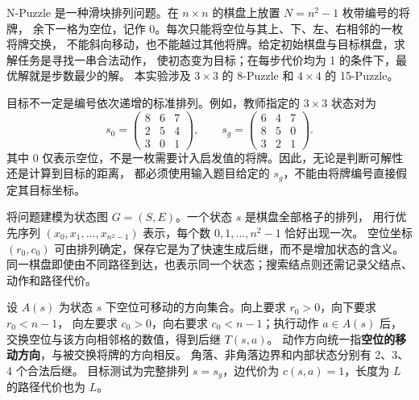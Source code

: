 \hypersetup{colorlinks=true, linkcolor=TemplateBlue, citecolor=TemplateBlue, urlcolor=TemplateBlue}


\par\vspace{6bp}
\begingroup
\setlength{\parskip}{3bp}

\par\vspace{2bp}

N-Puzzle 是一种滑块排列问题。在 $n\times n$ 的棋盘上放置 $N=n^2-1$ 枚带编号的将牌，
余下一格为空位，记作 0。每次只能将空位与其上、下、左、右相邻的一枚将牌交换，
不能斜向移动，也不能越过其他将牌。给定初始棋盘与目标棋盘，求解任务是寻找一串合法动作，
使初态变为目标；在每步代价均为 1 的条件下，最优解就是步数最少的解。
本实验涉及 $3\times3$ 的 8-Puzzle 和 $4\times4$ 的 15-Puzzle。

目标不一定是编号依次递增的标准排列。例如，教师指定的 $3\times3$ 状态对为
\[
s_0=\left(\begin{array}{ccc}8&6&7\\2&5&4\\3&0&1\end{array}\right),
\qquad
s_g=\left(\begin{array}{ccc}6&4&7\\8&5&0\\3&2&1\end{array}\right).
\]
其中 0 仅表示空位，不是一枚需要计入启发值的将牌。因此，无论是判断可解性还是计算到目标的距离，
都必须使用输入题目给定的 $s_g$，不能由将牌编号直接假定其目标坐标。

\par\vspace{2bp}

将问题建模为状态图 $G=(S,E)$。一个状态 $s$ 是棋盘全部格子的排列，
用行优先序列 $(x_0,x_1,\ldots,x_{n^2-1})$ 表示，每个数 $0,1,\ldots,n^2-1$ 恰好出现一次。
空位坐标 $(r_0,c_0)$ 可由排列确定，保存它是为了快速生成后继，而不是增加状态的含义。
同一棋盘即使由不同路径到达，也表示同一个状态；搜索结点则还需记录父结点、动作和路径代价。

设 $A(s)$ 为状态 $s$ 下空位可移动的方向集合。向上要求 $r_0>0$，向下要求 $r_0<n-1$，
向左要求 $c_0>0$，向右要求 $c_0<n-1$；执行动作 $a\in A(s)$ 后，
交换空位与该方向相邻格的数值，得到后继 $T(s,a)$。
动作方向统一指\textbf{空位的移动方向}，与被交换将牌的方向相反。
角落、非角落边界和内部状态分别有 2、3、4 个合法后继。
目标测试为完整排列 $s=s_g$，边代价为 $c(s,a)=1$，长度为 $L$ 的路径代价也为 $L$。

